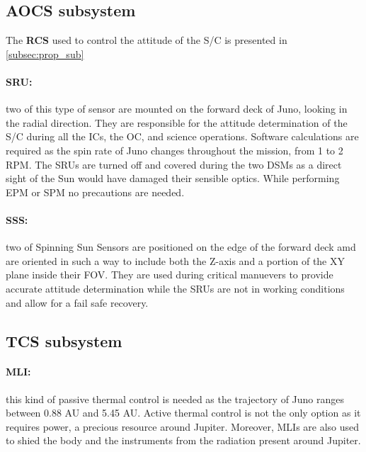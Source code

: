\subsection{AOCS subsystem}
\label{subsec:aocs_sub}

\vspace{-1mm}

The \textbf{RCS} used to control the attitude of the S/C is presented in \autoref{subsec:prop_sub}

\vspace{-4mm}

\paragraph{SRU:}two of this type of sensor are mounted on the forward deck of Juno, looking in the radial direction. They are responsible for the attitude determination of the S/C during all the ICs, the OC, and science operations. Software calculations are required as the spin rate of Juno changes throughout the mission, from 1 to 2 RPM. The SRUs are turned off and covered during the two DSMs as a direct sight of the Sun would have damaged their sensible optics. While performing EPM or SPM no precautions are needed.\cite{SRU}

\vspace{-4mm}

\paragraph{SSS:}two of Spinning Sun Sensors are positioned on the edge of the forward deck amd are oriented in such a way to include both the Z-axis and a portion of the XY plane inside their FOV. They are used during critical manuevers to provide accurate attitude determination while the SRUs are not in working conditions and allow for a fail safe recovery.\cite{SSS}

\subsection{TCS subsystem}
\label{subsec:tcs_sub}

\vspace{-1mm}

\paragraph{MLI:}this kind of passive thermal control is needed as the trajectory of Juno ranges between 0.88 AU and 5.45 AU. Active thermal control is not the only option as it requires power, a precious resource around Jupiter. Moreover, MLIs are also used to shied the body and the instruments from the radiation present around Jupiter. 

